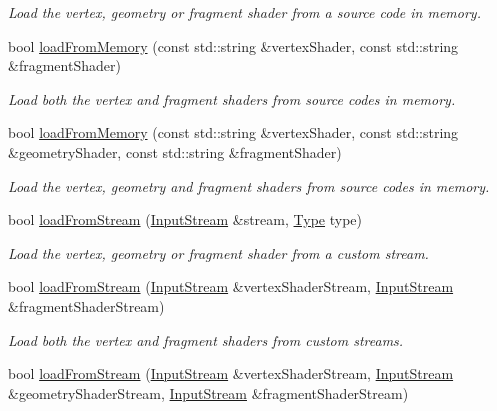 \begin{DoxyCompactItemize}
\begin{DoxyCompactList}\small\item\em Load the vertex, geometry or fragment shader from a source code in memory. \end{DoxyCompactList}\item 
bool \mbox{\hyperlink{classsf_1_1_shader_ae34e94070d7547a890166b7993658a9b}{load\+From\+Memory}} (const std\+::string \&vertex\+Shader, const std\+::string \&fragment\+Shader)
\begin{DoxyCompactList}\small\item\em Load both the vertex and fragment shaders from source codes in memory. \end{DoxyCompactList}\item 
bool \mbox{\hyperlink{classsf_1_1_shader_ab8c8b715b02aba2cf7c0a0e0c0984250}{load\+From\+Memory}} (const std\+::string \&vertex\+Shader, const std\+::string \&geometry\+Shader, const std\+::string \&fragment\+Shader)
\begin{DoxyCompactList}\small\item\em Load the vertex, geometry and fragment shaders from source codes in memory. \end{DoxyCompactList}\item 
bool \mbox{\hyperlink{classsf_1_1_shader_a2ee1b130c0606e4f8bcdf65c1efc2a53}{load\+From\+Stream}} (\mbox{\hyperlink{classsf_1_1_input_stream}{Input\+Stream}} \&stream, \mbox{\hyperlink{classsf_1_1_shader_afaa1aa65e5de37b74d047da9def9f9b3}{Type}} type)
\begin{DoxyCompactList}\small\item\em Load the vertex, geometry or fragment shader from a custom stream. \end{DoxyCompactList}\item 
bool \mbox{\hyperlink{classsf_1_1_shader_a3b7958159ffb5596c4babc3052e35465}{load\+From\+Stream}} (\mbox{\hyperlink{classsf_1_1_input_stream}{Input\+Stream}} \&vertex\+Shader\+Stream, \mbox{\hyperlink{classsf_1_1_input_stream}{Input\+Stream}} \&fragment\+Shader\+Stream)
\begin{DoxyCompactList}\small\item\em Load both the vertex and fragment shaders from custom streams. \end{DoxyCompactList}\item 
bool \mbox{\hyperlink{classsf_1_1_shader_aa08f1c091806205e6654db9d83197fcd}{load\+From\+Stream}} (\mbox{\hyperlink{classsf_1_1_input_stream}{Input\+Stream}} \&vertex\+Shader\+Stream, \mbox{\hyperlink{classsf_1_1_input_stream}{Input\+Stream}} \&geometry\+Shader\+Stream, \mbox{\hyperlink{classsf_1_1_input_stream}{Input\+Stream}} \&fragment\+Shader\+Stream)

\end{DoxyCompactItemize}
